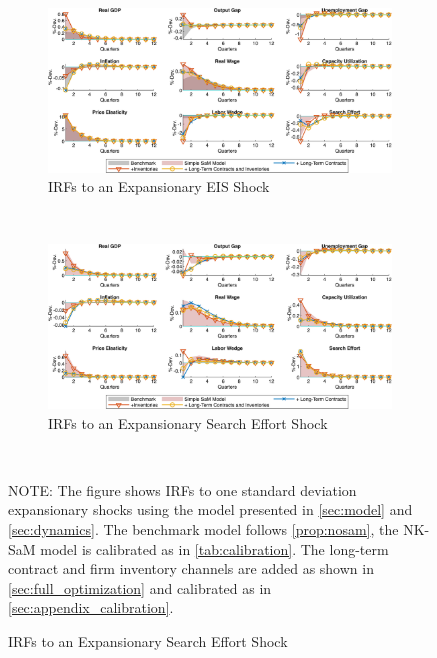 \documentclass[12pt,3p,authoryear,review]{elsarticle}
\begin{document}
\begin{figure}%
    \centering%
    \caption{Adding Inventories and Long-Term Contracts - IRFs to Expansionary Cost Push Shocks}\label{fig:app_irf_robust_longterm_sam_2}%
    \begin{subfigure}{\textwidth}%
        \centering%
        \caption{IRFs to an Expansionary EIS Shock}%
        \includegraphics[width=\textwidth]{fig_39_irf_robust_longterm_eis.png}%
    \end{subfigure}\\%
	\vspace{0.2in}%
    \begin{subfigure}{\textwidth}%
        \centering%
        \caption{IRFs to an Expansionary Search Effort Shock}%
        \includegraphics[width=\textwidth]{fig_40_irf_robust_longterm_search.png}%
    \end{subfigure}\\%
    {\tiny \singlespacing NOTE: The figure shows IRFs to one standard deviation expansionary shocks using the model presented in \cref{sec:model} and \cref{sec:dynamics}. The benchmark model follows \cref{prop:nosam}, the NK-SaM model is calibrated as in \cref{tab:calibration}. The long-term contract and firm inventory channels are added as shown in \ref{sec:full_optimization} and calibrated as in \ref{sec:appendix_calibration}.\par}%
\end{figure}%
\end{document}
